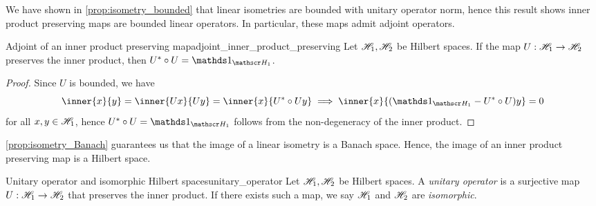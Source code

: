 We have shown in \cref{prop:isometry_bounded} that linear isometries are bounded with unitary operator norm, hence this result shows inner product preserving maps are bounded linear operators. In particular, these maps admit adjoint operators.
\begin{lemma}{Adjoint of an inner product preserving map}{adjoint_inner_product_preserving}
    Let \(\mathscr{H}_1, \mathscr{H}_2\) be Hilbert spaces. If the map \(U : \mathscr{H}_1 \to \mathscr{H}_2\) preserves the inner product, then \(U^* \circ U = \unity_{\hilbert_1}\).
\end{lemma}
\begin{proof}
    Since \(U\) is bounded, we have
    \begin{equation*}
        \inner{x}{y} = \inner{U x}{U y} = \inner{x}{U^* \circ Uy} \implies \inner{x}{(\unity_{\hilbert_1} - U^* \circ U)y} = 0
    \end{equation*}
    for all \(x, y \in \mathscr{H}_1\), hence \(U^* \circ U = \unity_{\hilbert_1}\) follows from the non-degeneracy of the inner product.
\end{proof}

\cref{prop:isometry_Banach} guarantees us that the image of a linear isometry is a Banach space. Hence, the image of an inner product preserving map is a Hilbert space.
\begin{definition}{Unitary operator and isomorphic Hilbert spaces}{unitary_operator}
    Let \(\mathscr{H}_1, \mathscr{H}_2\) be Hilbert spaces. A \emph{unitary operator} is a surjective map \(U : \mathscr{H}_1 \to \mathscr{H}_2\) that preserves the inner product. If there exists such a map, we say \(\mathscr{H}_1\) and \(\mathscr{H}_2\) are \emph{isomorphic}.
\end{definition}

